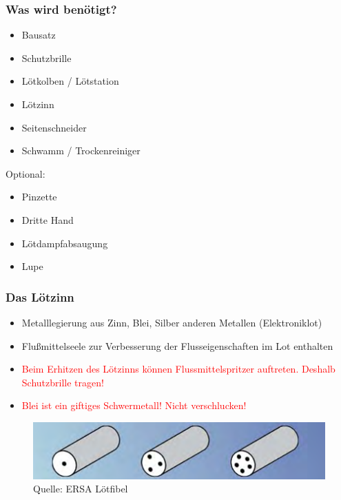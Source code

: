 \documentclass[10pt]{beamer}
\begin{document}
	\begin{frame}
		\frametitle{Was wird benötigt?}
		\begin{itemize}
			\item{Bausatz}
			\item{Schutzbrille}
			\item{Lötkolben / Lötstation}
			\item{Lötzinn}
			\item{Seitenschneider}
			\item{Schwamm / Trockenreiniger}
		\end{itemize}
		Optional:
		\begin{itemize}
			\item{Pinzette}
			\item{Dritte Hand}
			\item{Lötdampfabsaugung}
			\item{Lupe}	
		\end{itemize}
	\end{frame}

	\begin{frame}
	\frametitle{Das Lötzinn}
	\begin{itemize}
		\item{Metalllegierung aus Zinn, Blei, Silber anderen Metallen (Elektroniklot)}
		\item{Flußmittelseele zur Verbesserung der Flusseigenschaften im Lot enthalten}
		\item{\textcolor{red}{Beim Erhitzen des Lötzinns können Flussmittelspritzer auftreten. Deshalb Schutzbrille tragen!}}
		\item{\textcolor{red}{Blei ist ein giftiges Schwermetall! Nicht verschlucken!}}
	\end{itemize}
	\begin{figure}[hbtp]
		\centering
		\includegraphics[width=\linewidth]{images/lotseele.png}
		\caption{Quelle: ERSA Lötfibel}
	\end{figure}
	\end{frame}
\end{document}
